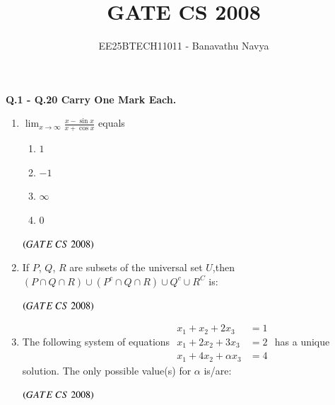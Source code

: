 \documentclass[journal]{IEEEtran}
\numberwithin{equation}{enumi}
\numberwithin{figure}{enumi}
\begin{document}

\vspace{3cm}

\title{GATE CS 2008}
\author{EE25BTECH11011 - Banavathu Navya}
\maketitle

\begin{center}
 \textbf{Q.1 - Q.20 Carry One Mark Each.}
\end{center}
\begin{enumerate}
    \item $\lim_{x \to \infty}\frac{x - \sin x}{x+ \cos x}$ equals
\begin{multicols}{4}
\begin{enumerate}
    \item $1$
    \item $-1$
    \item $\infty$
    \item $0$
\end{enumerate}
\end{multicols}
\hfill $\left(GATE\ CS\  2008\right)$

\item If $P$, $Q$, $R$ are subsets of the universal set $U$,then  $(P \cap Q \cap R) \cup (P^c \cap Q \cap R) \cup Q^c \cup R^C$ is:
\begin{enumerate} 
\end{enumerate}
\hfill $\left(GATE\ CS\  2008\right)$

\item The following system of equations
$
\begin{aligned}
x_1 + x_2 + 2x_3 &= 1 \\
x_1 + 2x_2 + 3x_3 &= 2 \\
x_1 + 4x_2 + \alpha x_3 &= 4
\end{aligned} $
has a unique solution. The only possible value(s) for \(\alpha\) is/are:
\begin{enumerate}  
\end{enumerate}
\hfill $\left(GATE\ CS\  2008\right)$


\end{enumerate}
\end{document}
